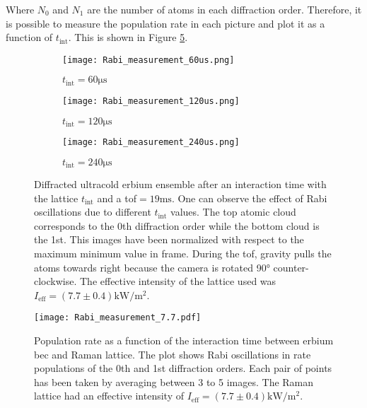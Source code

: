 Where $N_0$ and $N_1$ are the number of atoms in each diffraction order. Therefore, it is possible to measure the population rate in each picture and plot it as a function of $t_\text{int}$. This is shown in Figure \ref{fig:Bragg_measurement}.

\begin{figure}[!htbp]
	\centering
	\begin{subfigure}{.33\textwidth}
		\centering
		\texttt{[image: Rabi\_measurement\_60us.png]}
		\caption{ $t_\text{int} = 60\si{\micro\second}$}
		\label{fig:Bragg_images_1}
	\end{subfigure}%
	\begin{subfigure}{.33\textwidth}
		\centering
		\texttt{[image: Rabi\_measurement\_120us.png]}
		\caption{ $t_\text{int} = 120\si{\micro\second}$}
		\label{fig:Bragg_images_2}
	\end{subfigure}
	\begin{subfigure}{.33\textwidth}
		\centering
		\texttt{[image: Rabi\_measurement\_240us.png]}
		\caption{ $t_\text{int} = 240\si{\micro\second}$}
		\label{fig:Bragg_images_3}
	\end{subfigure}
	\caption[Diffracted ultracold erbium ensemble after an interaction time with the lattice $t_\text{int}$ and a \ac{tof}$=19\si{\milli\second}$]{Diffracted ultracold erbium ensemble after an interaction time with the lattice $t_\text{int}$ and a \ac{tof}$=19\si{\milli\second}$. One can observe the effect of Rabi oscillations due to different $t_\text{int}$ values. The top atomic cloud corresponds to the 0th diffraction order while the bottom cloud is the 1st. This images have been normalized with respect to the maximum minimum value in frame. During the \ac{tof}, gravity pulls the atoms towards right because the camera is rotated 90° counter-clockwise. The effective intensity of the lattice used was $I_\text{eff} = (7.7 \pm 0.4)\si{\kilo\watt\per\meter\squared}$.}
	\label{fig:Bragg_images}
\end{figure}

\begin{figure}[!htbp]\centering
	\texttt{[image: Rabi\_measurement\_7.7.pdf]}
	\caption[Population rate as a function of the interaction time between erbium \ac{bec} and Raman lattice]{Population rate as a function of the interaction time between erbium \ac{bec} and Raman lattice. The plot shows Rabi oscillations in rate populations of the 0th and 1st diffraction orders. Each pair of points has been taken by averaging between 3 to 5 images. The Raman lattice had an effective intensity of $I_\text{eff} = (7.7 \pm 0.4)\si{\kilo\watt\per\meter\squared}$. }\label{fig:Bragg_measurement}
\end{figure}

